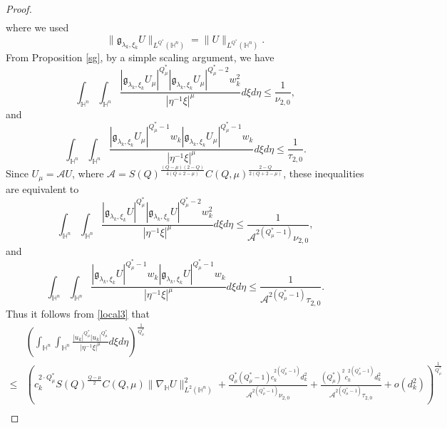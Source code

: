 \documentclass[10pt,a4paper]{amsart}
\begin{document}
\begin{proof}
\begin{align*}
 \end{align*}
{where we used}
 \begin{equation*}
 \|\mathfrak{g}_{\lambda_k,\xi_k}U\|_{L^{Q^{\ast}}(\mathbb{H}^{n})}=\|U\|_{L^{Q^{\ast}}(\mathbb{H}^{n})}.
 \end{equation*}
From Proposition \ref{sg}, by a simple scaling argument, we have
\begin{equation*}
 \int_{\mathbb{H}^{n}}\int_{\mathbb{H}^{n}}\frac{|\mathfrak{g}_{\lambda_k,\xi_k}U_\mu|^{Q^{\ast}_{\mu}}|\mathfrak{g}_{\lambda_k,\xi_k}U_\mu|
^{Q^{\ast}_{\mu}-2} w_k^2}{|\eta^{-1}\xi|^{\mu}}{d}\xi{d}\eta\leq\frac{1}{\nu_{2,0}},
\end{equation*}
and
\begin{equation*}
 \int_{\mathbb{H}^{n}}\int_{\mathbb{H}^{n}}\frac{|\mathfrak{g}_{\lambda_k,\xi_k}U_\mu|^{Q^{\ast}_{\mu}-1}w_k|\mathfrak{g}_{\lambda_k,\xi_k}U_\mu|
^{Q^{\ast}_{\mu}-1} w_k}{|\eta^{-1}\xi|^{\mu}}{d}\xi{d}\eta\leq\frac{1}{\tau_{2,0}}.
\end{equation*}
{Since $U_\mu=\mathcal AU$, where $\mathcal A=S(Q)^{\frac{(Q-\mu)(2-Q)}{4(Q+2-\mu)}}C(Q,\mu)^{\frac{2-Q}{2(Q+2-\mu)}}$, these inequalities are equivalent to}
\begin{equation*}
 \int_{\mathbb{H}^{n}}\int_{\mathbb{H}^{n}}\frac{|\mathfrak{g}_{\lambda_k,\xi_k}U|^{Q^{\ast}_{\mu}}|\mathfrak{g}_{\lambda_k,\xi_k}U|
^{Q^{\ast}_{\mu}-2} w_k^2}{|\eta^{-1}\xi|^{\mu}}{d}\xi{d}\eta\leq\frac{1}{\mathcal{A}^{2(Q^{\ast}_{\mu}-1)}\nu_{2,0}},
\end{equation*}
and
\begin{equation*}
 \int_{\mathbb{H}^{n}}\int_{\mathbb{H}^{n}}\frac{|\mathfrak{g}_{\lambda_k,\xi_k}U|^{Q^{\ast}_{\mu}-1}w_k|\mathfrak{g}_{\lambda_k,\xi_k}U|
^{Q^{\ast}_{\mu}-1} w_k}{|\eta^{-1}\xi|^{\mu}}{d}\xi{d}\eta\leq\frac{1}{\mathcal{A}^{2(Q^{\ast}_{\mu}-1)}\tau_{2,0}}.
\end{equation*}
 Thus it follows from \eqref{local3} that
 \begin{align*}
 &\left(\int_{\mathbb{H}^{n}}\int_{\mathbb{H}^{n}}\frac{|u_k|^{Q^{\ast}_{\mu}}|u_k|
^{Q^{\ast}_{\mu}}}{|\eta^{-1}\xi|^{\mu}}{d}\xi{d}\eta\right)^{\frac{1}{Q^{\ast}_{\mu}}}\\
\leq& \left(c_k^{2\cdot Q_{\mu}^{\ast}} S(Q)^{\frac{Q-\mu}{2}}C(Q,\mu) \|\nabla_\mathbb{H}U\|^2_{L^{2}(\mathbb{H}^{n})}+\frac{Q_{\mu}^{\ast}(Q_{\mu}^{\ast}-1)c_k^{2(Q_{\mu}^{\ast}-1)}d_k^2}{\mathcal{A}^{2(Q^{\ast}_{\mu}-1)}\nu_{2,0}}
+\frac{(Q_{\mu}^{\ast})^2c_k^{2(Q_{\mu}^{\ast}-1)}d_k^2}{\mathcal{A}^{2(Q^{\ast}_{\mu}-1)}\tau_{2,0}}+o(d_k^2)\right)^{\frac{1}{Q^{\ast}_{\mu}}}\\

\end{align*}
\end{proof}
\end{document}
